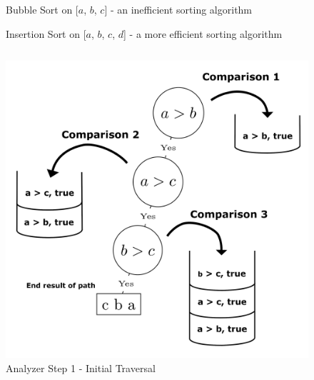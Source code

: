 \documentclass[final]{beamer}
\newlength{\onecolwid}
\newlength{\twocolwid}
\newlength{\onecolwidmid}
\begin{document}
\begin{frame}[t]
\begin{columns}[t]
\begin{column}{\twocolwid}
\begin{figure}
\resizebox{0.4\linewidth}{!}{}
\caption{Bubble Sort on [$a$, $b$, $c$] - an inefficient sorting algorithm}
\end{figure}



\begin{figure}
\resizebox{0.9\linewidth}{!}{}
\caption{Insertion Sort on [$a$, $b$, $c$, $d$] - a more efficient sorting algorithm}
\end{figure}


\begin{columns}[t,totalwidth=\twocolwid] %

\begin{column}{\onecolwidmid} %


\begin{figure}
\includegraphics[width=0.8\linewidth]{figures/bubble_sort_step_1_formatted.png}
\caption{Analyzer Step 1 - Initial Traversal}
\label{analyzer:1}
\end{figure}


\end{column}
\end{columns}
\end{column}
\end{columns}
\end{frame}
\end{document}

